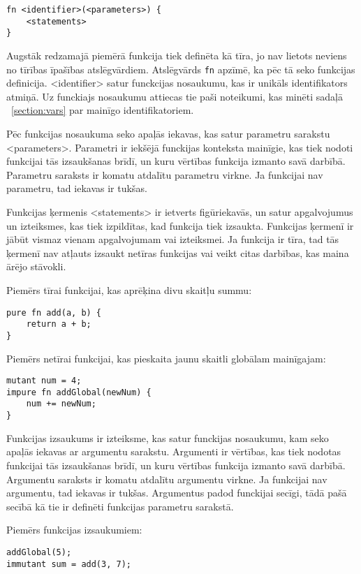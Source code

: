 \documentclass[12pt,a4paper]{report}
\begin{document}
\begin{verbatim}
fn <identifier>(<parameters>) {
    <statements>
}
\end{verbatim}

Augstāk redzamajā piemērā funkcija tiek definēta kā tīra, jo nav lietots neviens no tīrības īpašības atslēgvārdiem. Atslēgvārds \texttt{fn} apzīmē, ka pēc tā seko funkcijas definicija. <identifier> satur funckcijas nosaukumu, kas ir unikāls identifikators atmiņā. Uz funckiajs nosaukumu attiecas tie paši noteikumi, kas minēti sadaļā ~\ref{section:vars} par mainīgo identifikatoriem.

Pēc funkcijas nosaukuma seko apaļās iekavas, kas satur parametru sarakstu <parameters>. Parametri ir iekšējā funckijas konteksta mainīgie, kas tiek nodoti funkcijai tās izsaukšanas brīdī, un kuru vērtības funkcija izmanto savā darbībā. Parametru saraksts ir komatu atdalītu parametru virkne. Ja funkcijai nav parametru, tad iekavas ir tukšas.

Funkcijas ķermenis <statements> ir ietverts figūriekavās, un satur apgalvojumus un izteiksmes, kas tiek izpildītas, kad funkcija tiek izsaukta. Funkcijas ķermenī ir jābūt vismaz vienam apgalvojumam vai izteiksmei. Ja funkcija ir tīra, tad tās ķermenī nav atļauts izsaukt netīras funkcijas vai veikt citas darbības, kas maina ārējo stāvokli.

Piemērs tīrai funkcijai, kas aprēķina divu skaitļu summu:
\begin{verbatim}
pure fn add(a, b) {
    return a + b;
}
\end{verbatim}

Piemērs netīrai funkcijai, kas pieskaita jaunu skaitli globālam mainīgajam:
\begin{verbatim}
mutant num = 4;
impure fn addGlobal(newNum) {
    num += newNum;
}
\end{verbatim}

Funkcijas izsaukums ir izteiksme, kas satur funckijas nosaukumu, kam seko apaļās iekavas ar argumentu sarakstu. Argumenti ir vērtības, kas tiek nodotas funkcijai tās izsaukšanas brīdī, un kuru vērtības funkcija izmanto savā darbībā. Argumentu saraksts ir komatu atdalītu argumentu virkne. Ja funkcijai nav argumentu, tad iekavas ir tukšas. Argumentus padod funckijai secīgi, tādā pašā secībā kā tie ir definēti funkcijas parametru sarakstā. 

Piemērs funkcijas izsaukumiem:
\begin{verbatim}
addGlobal(5);
immutant sum = add(3, 7);
\end{verbatim}
\end{document}
